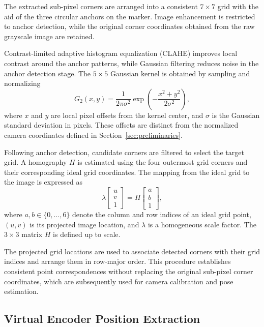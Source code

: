 \documentclass[journal]{IEEEtran}
\begin{document}
The extracted sub-pixel corners are arranged into
a consistent $7\times7$ grid with the aid of
the three circular anchors on the marker.
Image enhancement is restricted to anchor detection,
while the original corner coordinates obtained
from the raw grayscale image are retained.

Contrast-limited adaptive histogram equalization
(CLAHE) improves local contrast around the anchor
patterns, while Gaussian filtering reduces noise
in the anchor detection stage.
The $5\times5$ Gaussian kernel is obtained by
sampling and normalizing
\begin{equation}
\label{eq:gaussian_kernel}
G_2(x,y)
=
\frac{1}{2\pi\sigma^2}
\exp\left(-\frac{x^2+y^2}{2\sigma^2}\right),
\end{equation}
where $x$ and $y$ are local pixel offsets from
the kernel center, and $\sigma$ is the Gaussian
standard deviation in pixels. These offsets
are distinct from the normalized camera coordinates
defined in Section~\ref{sec:preliminaries}.

Following anchor detection, candidate corners
are filtered to select the target grid.
A homography $H$ is estimated using the four
outermost grid corners and their corresponding
ideal grid coordinates. The mapping from
the ideal grid to the image is expressed as
\begin{equation}
\label{eq:grid_homography}
\lambda
\begin{bmatrix}
u\\
v\\
1
\end{bmatrix}
=
H
\begin{bmatrix}
a\\
b\\
1
\end{bmatrix},
\end{equation}
where $a,b\in\{0,\ldots,6\}$ denote the column
and row indices of an ideal grid point,
$(u,v)$ is its projected image location,
and $\lambda$ is a homogeneous scale factor.
The $3\times3$ matrix $H$ is defined up to scale.

The projected grid locations are used to associate
detected corners with their grid indices and arrange
them in row-major order. This procedure establishes
consistent point correspondences without replacing
the original sub-pixel corner coordinates, which
are subsequently used for camera calibration
and pose estimation.

\subsection{Virtual Encoder Position Extraction}
\end{document}
